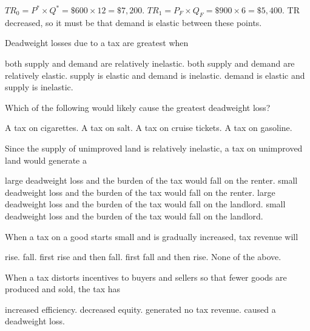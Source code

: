 \documentclass[addpoints,11pt]{exam}
\theoremstyle{definition}
\begin{document}
\begin{questions}
		
		\begin{solution}
			$TR_0 = P^* \times Q^* = \$600 \times 12 = \$7,200$. $TR_1 = P_F \times Q_F = \$900 \times 6 = \$5,400$. TR decreased, so it must be that demand is elastic between these points.
		\end{solution}
		
\question Deadweight losses due to a tax are greatest when

\begin{choices}
	\choice both supply and demand are relatively inelastic.
	\CorrectChoice both supply and demand are relatively elastic.
	\choice supply is elastic and demand is inelastic.
	\choice demand is elastic and supply is inelastic.
\end{choices}
		
\question Which of the following would likely cause the greatest deadweight loss?

\begin{choices}
	\choice A tax on cigarettes.
	\choice A tax on salt.
	\CorrectChoice A tax on cruise tickets.
	\choice A tax on gasoline.
\end{choices}

\question Since the supply of unimproved land is relatively inelastic, a tax on unimproved land would generate a 

\begin{choices}
	\choice large deadweight loss and the burden of the tax would fall on the renter.
	\choice small deadweight loss and the burden of the tax would fall on the renter.
	\choice large deadweight loss and the burden of the tax would fall on the landlord.
	\CorrectChoice small deadweight loss and the burden of the tax would fall on the landlord.
\end{choices}

\question When a tax on a good starts small and is gradually increased, tax revenue will

\begin{choices}
	\choice rise.
	\choice fall.
	\CorrectChoice first rise and then fall.
	\choice first fall and then rise.
	\choice None of the above.
\end{choices}

\newpage

\question When a tax distorts incentives to buyers and sellers so that fewer goods are produced and sold, the tax has

\begin{choices}
	\choice increased efficiency. 
	\choice decreased equity.
	\choice generated no tax revenue.
	\CorrectChoice caused a deadweight loss.
\end{choices}


\end{questions}
\end{document}
